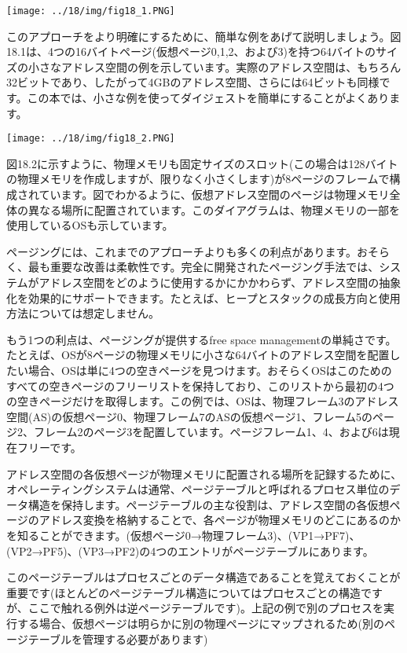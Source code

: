 \texttt{[image: ../18/img/fig18\_1.PNG]}

このアプローチをより明確にするために、簡単な例をあげて説明しましょう。図18.1は、4つの16バイトページ(仮想ページ0,1,2、および3)を持つ64バイトのサイズの小さなアドレス空間の例を示しています。実際のアドレス空間は、もちろん32ビットであり、したがって4GBのアドレス空間、さらには64ビットも同様です。この本では、小さな例を使ってダイジェストを簡単にすることがよくあります。

\texttt{[image: ../18/img/fig18\_2.PNG]}

図18.2に示すように、物理メモリも固定サイズのスロット(この場合は128バイトの物理メモリを作成しますが、限りなく小さくします)が8ページのフレームで構成されています。図でわかるように、仮想アドレス空間のページは物理メモリ全体の異なる場所に配置されています。このダイアグラムは、物理メモリの一部を使用しているOSも示しています。

ページングには、これまでのアプローチよりも多くの利点があります。おそらく、最も重要な改善は柔軟性です。完全に開発されたページング手法では、システムがアドレス空間をどのように使用するかにかかわらず、アドレス空間の抽象化を効果的にサポートできます。たとえば、ヒープとスタックの成長方向と使用方法については想定しません。

もう1つの利点は、ページングが提供するfree space
managementの単純さです。たとえば、OSが8ページの物理メモリに小さな64バイトのアドレス空間を配置したい場合、OSは単に4つの空きページを見つけます。おそらくOSはこのためのすべての空きページのフリーリストを保持しており、このリストから最初の4つの空きページだけを取得します。この例では、OSは、物理フレーム3のアドレス空間(AS)の仮想ページ0、物理フレーム7のASの仮想ページ1、フレーム5のページ2、フレーム2のページ3を配置しています。ページフレーム1、4、および6は現在フリーです。

アドレス空間の各仮想ページが物理メモリに配置される場所を記録するために、オペレーティングシステムは通常、ページテーブルと呼ばれるプロセス単位のデータ構造を保持します。ページテーブルの主な役割は、アドレス空間の各仮想ページのアドレス変換を格納することで、各ページが物理メモリのどこにあるのかを知ることができます。(仮想ページ0→物理フレーム3)、(VP1→PF7)、(VP2→PF5)、(VP3→PF2)の4つのエントリがページテーブルにあります。

このページテーブルはプロセスごとのデータ構造であることを覚えておくことが重要です(ほとんどのページテーブル構造についてはプロセスごとの構造ですが、ここで触れる例外は逆ページテーブルです)。上記の例で別のプロセスを実行する場合、仮想ページは明らかに別の物理ページにマップされるため(別のページテーブルを管理する必要があります)

